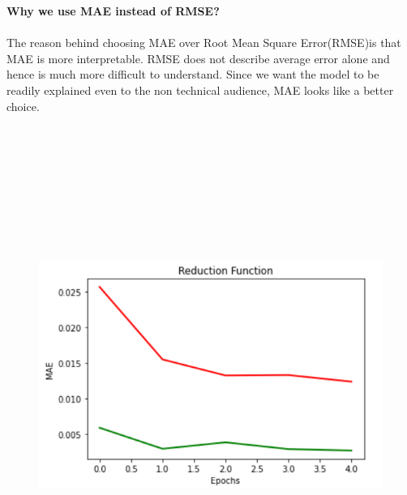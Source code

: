 \documentclass[openany,12pt]{report}
\begin{document}
{{{{\newpage
\textbf{Why we use MAE instead of RMSE?}\\ \\
The reason behind choosing MAE over Root Mean Square Error(RMSE)is that MAE is more interpretable. RMSE does not describe average error alone and hence is much more difficult to understand. Since we want the model to be readily explained even to the non technical audience, MAE looks like a better choice.
\\
\\
\begin{figure}[H]
\centering
\includegraphics[width=6in,height=6in]{./Reduction.png}
\end{figure}

}}}}
\end{document}
